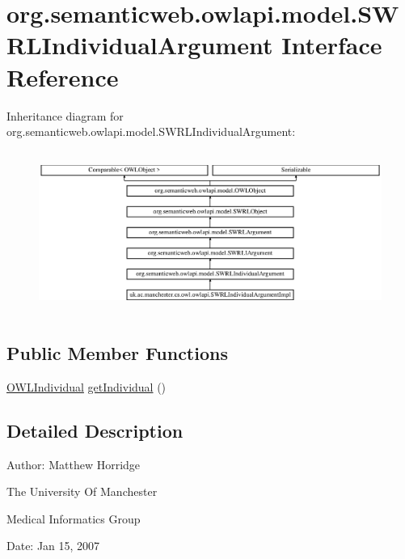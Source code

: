 \hypertarget{interfaceorg_1_1semanticweb_1_1owlapi_1_1model_1_1_s_w_r_l_individual_argument}{\section{org.\-semanticweb.\-owlapi.\-model.\-S\-W\-R\-L\-Individual\-Argument Interface Reference}
\label{interfaceorg_1_1semanticweb_1_1owlapi_1_1model_1_1_s_w_r_l_individual_argument}
}
Inheritance diagram for org.\-semanticweb.\-owlapi.\-model.\-S\-W\-R\-L\-Individual\-Argument\-:\begin{figure}[H]
\begin{center}
\leavevmode
\includegraphics[height=5.326087cm]{interfaceorg_1_1semanticweb_1_1owlapi_1_1model_1_1_s_w_r_l_individual_argument}
\end{center}
\end{figure}
\subsection*{Public Member Functions}
\begin{DoxyCompactItemize}
\item 
\hyperlink{interfaceorg_1_1semanticweb_1_1owlapi_1_1model_1_1_o_w_l_individual}{O\-W\-L\-Individual} \hyperlink{interfaceorg_1_1semanticweb_1_1owlapi_1_1model_1_1_s_w_r_l_individual_argument_aac90710c937c4718c9df06a4059df814}{get\-Individual} ()
\end{DoxyCompactItemize}


\subsection{Detailed Description}
Author\-: Matthew Horridge\par
 The University Of Manchester\par
 Medical Informatics Group\par
 Date\-: Jan 15, 2007\par
\par
 

